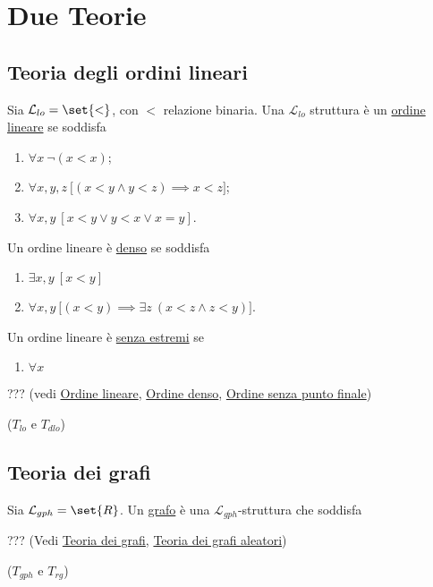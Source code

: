 \documentclass[10pt]{article}
\newcommand{\1}{\mathds{1}}
\theoremstyle{definition}%
\theoremstyle{plain}
\theoremstyle{remark}
\begin{document}
\section{Due Teorie}
\label{sec:org51b7b1c}

\subsection{Teoria degli ordini lineari}
\label{sec:orgb6e1ce8}

Sia \(\mathcal{L}_{lo}=\set{<}\), con \(<\) relazione binaria. Una \(\mathcal{L}_{lo}\) struttura è un \uline{ordine lineare} se soddisfa
\begin{enumerate}
\item \(\forall x\ \lnot(x<x)\);
\item \(\forall x,y,z\ \big[(x<y \land y<z)\implies x<z\big]\);
\item \(\forall x,y\ [x<y \lor y<x \lor x=y]\).
\end{enumerate}
Un ordine lineare è \uline{denso} se soddisfa
\begin{enumerate}
\item \(\exists x,y\ [x<y]\)
\item \(\forall x,y\ \big[(x<y)\implies \exists z\ (x<z \land z<y)\big]\).
\end{enumerate}
Un ordine lineare è \uline{senza estremi} se
\begin{enumerate}
\item \(\forall x\)
\end{enumerate}

??? (vedi \href{../../../../org/roam/20250203101604-ordine.org}{Ordine lineare}, \href{../../../../org/roam/20250203101604-ordine.org}{Ordine denso}, \href{../../../../org/roam/20250203101604-ordine.org}{Ordine senza punto finale})

(\(T_{lo}\) e \(T_{dlo}\))
\subsection{Teoria dei grafi}
\label{sec:orgffd7af6}

Sia \(\mathcal{L}_{gph} = \set{R}\). Un \uline{grafo} è una \(\mathcal{L}_{gph}\)-struttura che soddisfa

??? (Vedi \href{../../../../org/roam/20250213123032-teoria_dei_grafi.org}{Teoria dei grafi}, \href{../../../../org/roam/20250213123032-teoria_dei_grafi.org}{Teoria dei grafi aleatori})

(\(T_{gph}\) e \(T_{rg}\))
\end{document}

